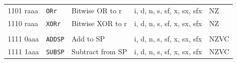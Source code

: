 \documentclass[10pt,fleqn]{book}
\begin{document}
\begin{tabular}{ l l l l l }
1101 raaa   & \verb|ORr|     & Bitwise OR to r                      & i, d, n, s, sf, x, sx, sfx  & NZ \\
1110 raaa   & \verb|XORr|    & Bitwise XOR to r                     & i, d, n, s, sf, x, sx, sfx  & NZ \\
 \\
1111 0aaa   & \verb|ADDSP|   & Add to SP                            & i, d, n, s, sf, x, sx, sfx  & NZVC \\
1111 1aaa   & \verb|SUBSP|   & Subtract from SP                     & i, d, n, s, sf, x, sx, sfx  & NZVC \\
\bottomrule
\end{tabular}

\newpage

\end{document}
